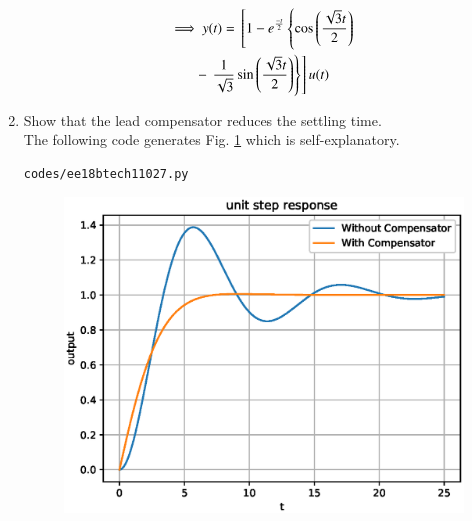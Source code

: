 \begin{enumerate}[label=\thesection.\arabic*.,ref=\thesection.\theenumi]
\begin{multline}
\implies         y(t) = {}\left[1 - e^{\frac{-t}{2}}\left\{\cos\left(\frac{\sqrt{3}t}{2}\right)\right.\right.
\\
- {}\left.\left.\frac{1}{\sqrt{3}}\sin\left(\frac{\sqrt{3}t}{2}\right)\right\} \right]u(t)
\end{multline}

\item Show that the lead compensator reduces the settling time.
\\
\solution The following code generates Fig. \ref{fig:ee18btech11027} which is self-explanatory.
\begin{lstlisting}
codes/ee18btech11027.py
\end{lstlisting}

\begin{figure}[!ht]
\includegraphics[width=\columnwidth]{./figs/ee18btech11027/ee18btech11027.eps} 
\caption{}
\label{fig:ee18btech11027}
\end{figure}
\end{enumerate}
